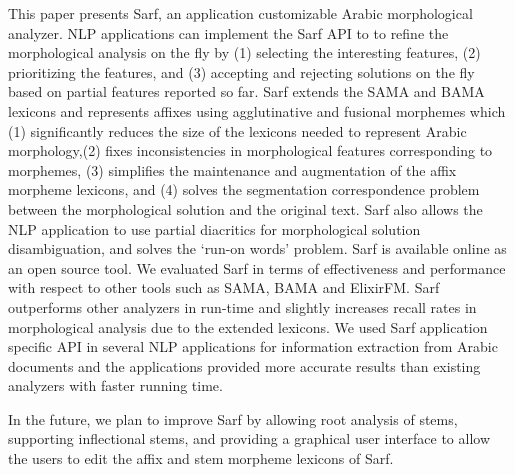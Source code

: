 This paper presents Sarf, an application customizable Arabic morphological analyzer. 
NLP applications can implement the Sarf API to 
to refine the morphological analysis on the fly by 
(1) selecting the interesting features, (2) prioritizing the features, and
(3) accepting and rejecting solutions on the fly based on partial features reported 
so far. 
Sarf extends the SAMA and BAMA lexicons and 
represents affixes using agglutinative and fusional morphemes which 
(1) significantly reduces the size of the lexicons needed to represent Arabic morphology,(2) fixes inconsistencies in morphological features corresponding to morphemes,
(3) simplifies the maintenance and augmentation of the affix morpheme lexicons, and
(4) solves the segmentation correspondence problem between the morphological solution 
and the original text. 
Sarf also allows the NLP application to use partial diacritics for morphological solution
disambiguation, and solves the `run-on words' problem.
Sarf is available online as an open source tool. 
We evaluated Sarf in terms of effectiveness and performance with respect to 
other tools such as SAMA, BAMA and ElixirFM. Sarf outperforms other analyzers in 
run-time and slightly increases recall rates in morphological analysis due to the 
extended lexicons. 
We used Sarf application specific API in several NLP applications 
for information extraction from Arabic documents and the applications
provided more accurate results than existing analyzers with faster running time. 

In the future, we plan to improve Sarf by allowing root analysis of stems,
supporting inflectional stems, and providing a graphical user interface to 
allow the users to edit the affix and stem morpheme lexicons of Sarf. 
